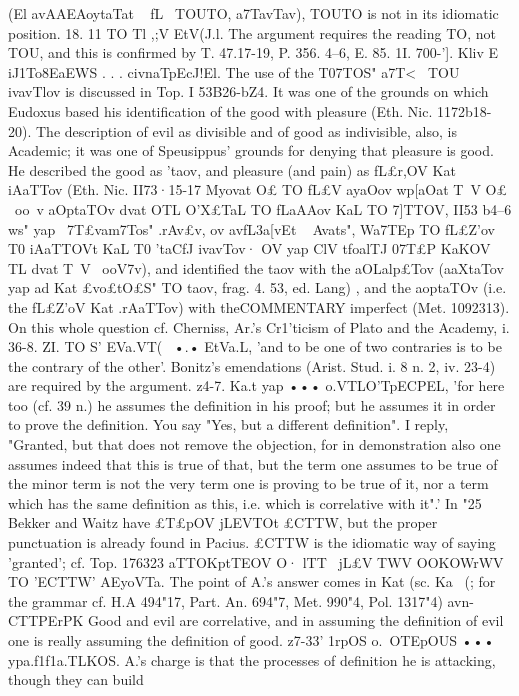 {{{{{{{{{{{{{{{{{{{(El avAAEAoytaTat ~ fL~ TOUTO, a7TavTav), TOUTO is not in its idiomatic
position.
18. 11 TO Tl ,;V EtV(J.l. The argument requires the reading TO,
not TOU, and this is confirmed by T. 47.17-19, P. 356. 4--6, E. 85. 1I.
700-']. Kliv E~ iJ1To8EaEWS . . . civnaTpEcJ!El. The use of the
T07TOS" a7T<~ TOU ivavTlov is discussed in Top. I 53B26-bZ4. It was one
of the grounds on which Eudoxus based his identification of
the good with pleasure (Eth. Nic. 1172b18-20). The description of
evil as divisible and of good as indivisible, also, is Academic;
it was one of Speusippus' grounds for denying that pleasure is
good. He described the good as 'taov, and pleasure (and pain) as
fL£r,OV Kat iAaTTov (Eth. Nic. II73·15-17 Myovat O£ TO fL£V ayaOov
wp[aOat T~V O£ ~oo~v aOptaTOv dvat OTL O'X£TaL TO fLaAAov KaL TO
7]TTOV, II53 b4--6 ws" yap ~7T£vam7Tos" .rAv£v, ov avfL{3a[vEt ~ Avats",
Wa7TEp TO fL£Z'ov T0 iAaTTOVt KaL T0 'taCfJ ivavT{ov· OV yap ClV tfoalTJ
07T£P KaKOV TL dvat T~V ~ooV7}v), and identified the taov with the
aOLalp£Tov (aaXtaTov yap ad Kat £vo£tO£S" TO taov, frag. 4. 53, ed.
Lang) , and the aoptaTOv (i.e. the fL£Z'oV Kat .rAaTTov) with theCOMMENTARY
imperfect (Met. 1092313). On this whole question cf. Cherniss,
Ar.'s Cr1'ticism of Plato and the Academy, i. 36-8.
ZI. TO S' EVa.VT(~ •.• EtVa.L, 'and to be one of two contraries
is to be the contrary of the other'. Bonitz's emendations (Arist.
Stud. i. 8 n. 2, iv. 23-4) are required by the argument.
z4-7. Ka.t yap ••• o.VTLO'TpECPEL, 'for here too (cf. 39 n.) he
assumes the definition in his proof; but he assumes it in order to
prove the definition. You say "Yes, but a different definition".
I reply, "Granted, but that does not remove the objection, for
in demonstration also one assumes indeed that this is true of
that, but the term one assumes to be true of the minor term is
not the very term one is proving to be true of it, nor a term which
has the same definition as this, i.e. which is correlative with it".'
In "25 Bekker and Waitz have £T£pOV jLEVTOt £CTTW, but the
proper punctuation is already found in Pacius. £CTTW is the
idiomatic way of saying 'granted'; cf. Top. 176323 aTTOKptTEOV O·
lTT~ jL£V TWV OOKOWrWV TO 'ECTTW' AEyoVTa.
The point of A.'s answer comes in Kat (sc. Ka~ (}; for the grammar
cf. H.A 494"17, Part. An. 694"7, Met. 990"4, Pol. 1317"4) avn-
CTTPErPK Good and evil are correlative, and in assuming the
definition of evil one is really assuming the definition of good.
z7-33' 1rpOS o.~OTEpOUS ••• ypa.f1f1a.TLKOS. A.'s charge is that
the processes of definition he is attacking, though they can build
}}}}}}}}}}}}}}}}}}}

